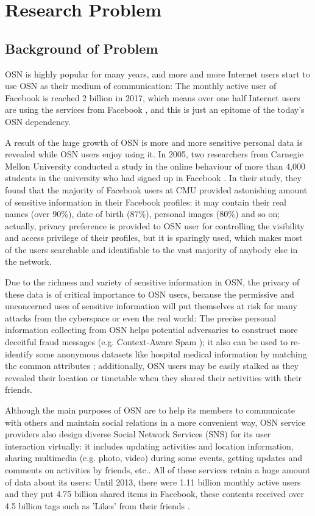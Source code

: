 \chapter{Research Problem}
\section{Background of Problem}
OSN is highly popular for many years, and more and more Internet users start to use OSN as their medium of communication: The monthly active user of Facebook is reached 2 billion in 2017, which means over one half Internet users are using the services from Facebook \cite{statista2017facebook, itstat2017population}, and this is just an epitome of the today's OSN dependency.

A result of the huge growth of OSN is more and more sensitive personal data is revealed while OSN users enjoy using it. In 2005, two researchers from Carnegie Mellon University conducted a study in the online behaviour of more than 4,000 students in the university who had signed up in Facebook \cite{gross2005information}. In their study, they found that the majority of Facebook users at CMU provided astonishing amount of sensitive information in their Facebook profiles: it may contain their real names (over $90\%$), date of birth ($87\%$), personal images ($80\%$) and so on; actually, privacy preference is provided to OSN user for controlling the visibility and access privilege of their profiles, but it is sparingly used, which makes most of the users searchable and identifiable to the vast majority of anybody else in the network. 

Due to the richness and variety of sensitive information in OSN, the privacy of these data is of critical importance to OSN users, because the permissive and unconcerned uses of sensitive information will put themselves at risk for many attacks from the cyberspace or even the real world: The precise personal information collecting from OSN helps potential adversaries to construct more deceitful fraud messages (e.g. Context-Aware Spam \cite{brown2008social}); it also can be used to re-identify some anonymous datasets like hospital medical information by matching the common attributes \cite{sweeney2002k}; additionally, OSN users may be easily stalked as they revealed their location or timetable when they shared their activities with their friends.

Although the main purposes of OSN are to help its members to communicate with others and maintain social relations in a more convenient way, OSN service providers also design diverse Social Network Services (SNS) for its user interaction virtually: it includes updating activities and location information, sharing multimedia (e.g. photo, video) during some events, getting updates and comments on activities by friends, etc.. All of these services retain a huge amount of data about its users: Until 2013, there were 1.11 billion monthly active users and they put 4.75 billion shared items in Facebook, these contents received over 4.5 billion tags such as 'Likes' from their friends \cite{facebook2013growth}. 

